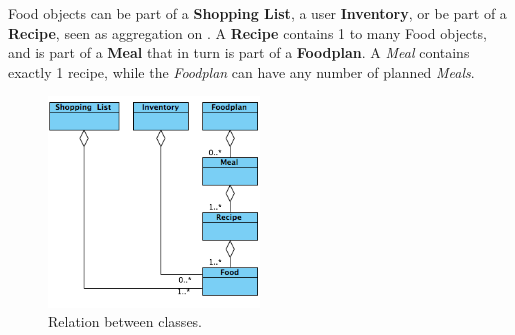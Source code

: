Food objects can be part of a \textbf{Shopping List}, a user \textbf{Inventory}, or be part of a \textbf{Recipe}, seen as aggregation on . A \textbf{Recipe} contains 1 to many Food objects, and is part of a \textbf{Meal} that in turn is part of a \textbf{Foodplan}. A \textit{Meal} contains exactly 1 recipe, while the \textit{Foodplan} can have any number of planned \textit{Meals}.

\begin{figure}[H]
	\centering
	\includegraphics[width=0.50\textwidth]{Grafik/FoodPlanner/FoodPlannerClassDiagram.png}
	\caption{Relation between classes.}
	\label{fig:classDiagram}
\end{figure}